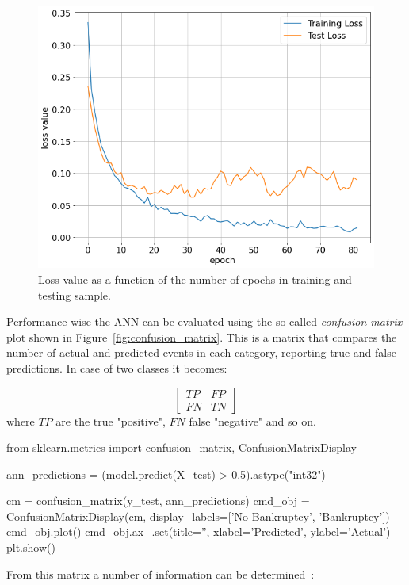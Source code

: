 \begin{figure}[htbp]
\centering
\includegraphics[width=0.7\linewidth]{figures/bankruptcy_loss}
\caption{Loss value as a function of the number of epochs in training and testing sample.}
\label{fig:bankruptcy_loss}
\end{figure}

Performance-wise the ANN can be evaluated using the so called \emph{confusion matrix} plot shown in Figure~\ref{fig:confusion_matrix}. This is a matrix that compares the number of actual and predicted events in each category, reporting true and false predictions. In case of two classes it becomes:

\begin{equation*}
\begin{bmatrix}
	TP & FP \\
	FN & TN  
\end{bmatrix}
\end{equation*}
\noindent
where $TP$ are the true "positive", $FN$ false "negative" and so on.

\begin{ipythonnon}
from sklearn.metrics import confusion_matrix, ConfusionMatrixDisplay
	
ann_predictions = (model.predict(X_test) > 0.5).astype("int32")
	
cm = confusion_matrix(y_test, ann_predictions)
cmd_obj = ConfusionMatrixDisplay(cm, display_labels=['No Bankruptcy',
                                                     'Bankruptcy'])
cmd_obj.plot()
cmd_obj.ax_.set(title='', xlabel='Predicted', ylabel='Actual')
plt.show()
\end{ipythonnon}
\noindent
From this matrix a number of information can be determined~\cite{bib:sensitivity}:

